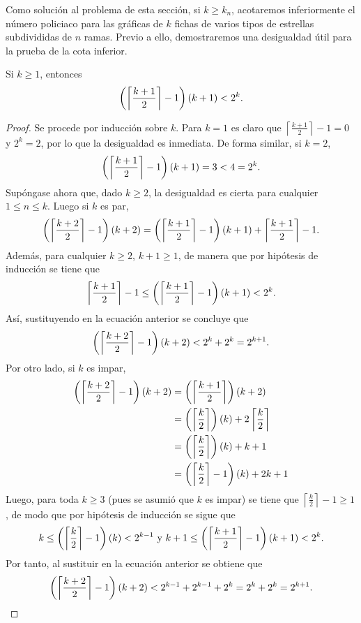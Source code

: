 Como soluci\'on al problema de esta secci\'on, si $k\geq k_n$, acotaremos
inferiormente el n\'umero policiaco para las gr\'aficas de $k$ fichas de varios
tipos de estrellas subdivididas de $n$ ramas. Previo a ello, demostraremos una
desigualdad \'util para la prueba de la cota inferior.

\begin{lema}
\label{lem:desigualdad1}
    Si $k\geq 1$, entonces
    \[
        \left( \left\lceil\frac{k+1}{2}\right\rceil - 1\right)\left( k+1\right) < 2^k.
    \]
\end{lema}
    
\begin{proof}
    Se procede por inducci\'on sobre $k$. Para $k=1$ es claro que
    $\left\lceil\frac{k+1}{2}\right\rceil - 1 = 0$ y $2^k =2$, por lo que la
    desigualdad es inmediata. De forma similar, si $k=2$,
    \[
        \left( \left\lceil\frac{k+1}{2}\right\rceil - 1\right)\left( k+1\right) = 3 < 4 
        = 2^k.
    \]
    Sup\'ongase ahora que, dado $k\geq 2$, la desigualdad es cierta para
    cualquier $1\leq n\leq k$. Luego si $k$ es par,
    \[
        \left( \left\lceil\frac{k+2}{2}\right\rceil - 1\right)\left( k+2\right) = 
        \left( \left\lceil\frac{k+1}{2}\right\rceil - 1\right)\left( k+1\right) + 
        \left\lceil\frac{k+1}{2}\right\rceil - 1.
    \]
    Adem\'as, para cualquier $k\geq2$, $k+1\geq 1$, de manera que por
    hip\'otesis de inducci\'on se tiene que
    \[
        \left\lceil\frac{k+1}{2}\right\rceil- 1 \leq \left( \left\lceil\frac
        {k+1}{2}\right\rceil - 1\right)\left( k+1\right) < 2^k.
    \]
    As\'i, sustituyendo en la ecuaci\'on anterior se concluye que
    \[
        \left( \left\lceil\frac{k+2}{2}\right\rceil - 1\right)\left( k+2\right) < 2^k 
        + 2^k = 2^{k+1}.
    \]
    Por otro lado, si $k$ es impar,
    \begin{align*}
        \left( \left\lceil\frac{k+2}{2}\right\rceil - 1\right)\left( k+2\right)
        &=\left( \left\lceil\frac{k+1}{2}\right\rceil\right)\left( k+2\right)\\
        &=\left( \left\lceil\frac{k}{2}\right\rceil\right)\left( k\right) + 
        2\left\lceil\frac{k}{2}\right\rceil \\
        &=\left( \left\lceil\frac{k}{2}\right\rceil\right)\left( k\right) + k+1\\
        &=\left( \left\lceil\frac{k}{2}\right\rceil -1\right)\left( k\right) + 2k+1
    \end{align*}
    Luego, para toda $k\geq 3$ (pues se asumi\'o que $k$ es impar) se tiene que
    $\left\lceil\frac{k}{2}\right\rceil - 1 \geq 1$, de modo que por hip\'otesis
    de inducci\'on se sigue que
    \[
        k\leq \left( \left\lceil\frac{k}{2}\right\rceil -1\right)\left( k\right) < 2^{k-1}
        \text{ y } k+1 \leq \left( \left\lceil\frac{k+1}{2}\right\rceil -1\right)
        \left( k+1\right) < 2^{k}.
    \] 
    Por tanto, al sustituir en la ecuaci\'on anterior se obtiene que
    \[
        \left( \left\lceil\frac{k+2}{2}\right\rceil - 1\right)\left( k+2\right) < 2^{k-1} +
            2^{k-1} + 2^{k} = 2^{k} + 2^{k} = 2^{k+1}.
    \]

\end{proof}

